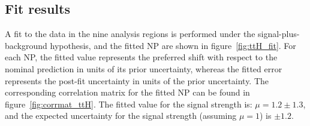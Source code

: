 


\subsection{Fit results}
\label{subsec:fit_ttH}
A fit to the data in the nine analysis regions is performed under the signal-plus-background hypothesis, and the fitted NP are shown in figure~\ref{fig:ttH_fit}.
For each NP, the fitted value represents the preferred shift with respect to the nominal prediction in units of its prior uncertainty, 
whereas the fitted error represents the post-fit uncertainty in units of the prior uncertainty. 
The corresponding correlation matrix for the
fitted NP can be found in figure~\ref{fig:corrmat_ttH}.
The fitted value for the signal strength is: $\mu= 1.2 \pm 1.3$, and the expected uncertainty for the signal strength (assuming $\mu = 1$) is $\pm 1.2$.

